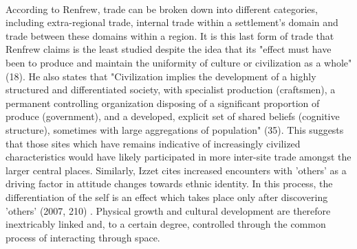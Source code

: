 \documentclass[12pt,a4paper]{thesis}
\begin{document}
\paragraph{}	
According to Renfrew, trade can be broken down into different categories,  including extra-regional trade, internal trade within a settlement's domain and trade between these domains within a region.  It is this last form of trade that Renfrew claims is the least studied despite the idea that its "effect must have been to produce and maintain the uniformity of culture or civilization as a whole" (18). He also states that "Civilization implies the development of a highly structured and differentiated society, with specialist production (craftsmen), a permanent controlling organization disposing of a significant proportion of produce (government), and a developed, explicit set of shared beliefs (cognitive structure), sometimes with large aggregations of population" (35). This suggests that those sites which have remains indicative of increasingly civilized characteristics would have likely participated in more inter-site trade amongst the larger central places. Similarly, Izzet cites increased encounters with 'others' as a driving factor in attitude changes towards ethnic identity. In this process, the differentiation of the self is an effect which takes place only after  discovering 'others' (2007, 210) . Physical growth and cultural development are therefore inextricably linked and, to a certain degree, controlled through the common process of interacting through space. 
\end{document}
